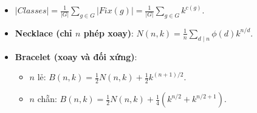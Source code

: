 \begin{itemize}
    \item $|Classes| = \frac{1}{|G|} \sum_{g \in G} |Fix(g)| = \frac{1}{|G|} \sum_{g \in G} k^{c(g)}$.
    \item \textbf{Necklace (chỉ $n$ phép xoay)}: $N(n, k) = \frac{1}{n} \sum_{d \mid n} \phi(d) k^{n / d}$.
    \item \textbf{Bracelet (xoay và đối xứng)}:
    \begin{itemize}
        \item $n$ lẻ: $B(n, k) = \frac{1}{2} N(n, k) + \frac{1}{2} k^{(n+1)/2}$.
        \item $n$ chẵn: $B(n, k) = \frac{1}{2} N(n, k) + \frac{1}{4} (k^{n/2} + k^{n/2 + 1})$.
    \end{itemize}
\end{itemize}

